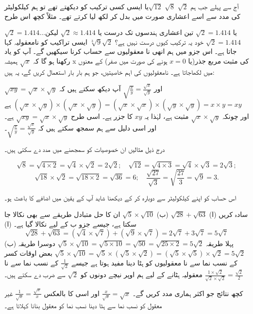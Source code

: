 آج سے پہلے جب ہم  \(\sqrt{2}\) \(\sqrt{8}\) \(\sqrt{12}\)یا ایسی کسی ترکیب کو دیکھتے تھے تو ہم کیلکولیٹر کی مدد سے اسے اعشاری صورت میں بدل کر لکھ لیا کرتے تھے۔ مثلاً کچھ اس طرح

\(\sqrt{2}=1.414\dotsc\)یا 
\(\sqrt{2}=1.414\) تین اعشاری ہندسوں تک درست یا
\(\sqrt{2}\approx 1.414\)
لیکن \(\sqrt{2}=1.414\) خود یہ ترکیب کیوں درست نہیں ہے؟
\(\sqrt{2}\)\(\sqrt[3]{9}\) ایسی تراکیب کو نامعقولیہ کہا جاتا ہے۔ اس جزو میں ہم انھی نا معقولیوں سے حساب کرنا سیکھیں گے۔
آپ کو یاد رکھنا ہو گا کہ \(\sqrt{x}\) ہمیشہ x کی مثبت مربع جذر(یا \(x=0\) ہونے کی صورت میں صفر) کے معنوں میں لکھاجاتا ہے۔
نامعقولیوں کی اہم خاصیتیں، جو ہم بار بار استعمال کریں گے، یہ ہیں:

\(\sqrt{xy}=\sqrt{x}\times\sqrt{y}\)
 اور 
\(\sqrt{\frac{x}{y}}=\frac{\sqrt{x}}{\sqrt{y}}\)
آپ دیکھ سکتے ہیں کہ \((\sqrt{x}\times\sqrt{y})\times(\sqrt{x}\times\sqrt{y})=(\sqrt{x}\times\sqrt{x})\times(\sqrt{y}\times\sqrt{y})=x\times y=xy\)  ہے اور چونکہ \(\sqrt{x}\times\sqrt{y}\) مثبت ہے، لہٰذا یہ \(xy\) کا جزر ہے۔ اسی طرح \(\sqrt{xy}=\sqrt{x}\times\sqrt{y}\) ہے۔ اور اسی دلیل سے ہم سمجھ سکتے ہیں کہ \(\sqrt{\frac{x}{y}}=\frac{\sqrt{x}}{\sqrt{y}}\)۔

درج ذیل مثالیں ان خصوصیات کو سمجھنے میں مدد دے سکتی ہیں۔

\[\sqrt{8}=\sqrt{4\times 2}=\sqrt{4}\times\sqrt{2}=2\sqrt{2};\quad\sqrt{12}=\sqrt{4\times 3}=\sqrt{4}\times\sqrt{3}=2\sqrt{3};\]
\[\sqrt{18}\times \sqrt{2}=\sqrt{18\times 2}=\sqrt{36}=6;\quad \frac{\sqrt{27}}{\sqrt{3}}=\sqrt{\frac{27}{3}}=\sqrt{9}=3.\]

اس حساب کو اپنے کیلکولیٹر سے دوبارہ کر کے دیکھنا شاید آپ کے یقین میں اضافے کا باعث ہو۔

سادہ کریں 
(ا)
\(\sqrt{28}+\sqrt{63}\)
(ب) 
\(\sqrt{5}\times \sqrt{10}\)
ان کا حل متبادل طریقے سے بھی نکالا جا سکتا ہے، جیسے جزو ب کے لیے نکالا گیا ہے۔
(ا) \[\sqrt{28}+\sqrt{63}=(\sqrt{4}\times\sqrt{7})+(\sqrt{9}\times\sqrt{7})=2\sqrt{7}+3\sqrt{7}=5\sqrt{7}\]
(ب) پہلا طریقہ \(\sqrt{5}\times\sqrt{10}=\sqrt{5\times10}=\sqrt{50}=\sqrt{25\times 2}=5\sqrt{2}\)
دوسرا طریقہ \(\sqrt{5}\times\sqrt{10}=\sqrt{5}\times(\sqrt{5}\times\sqrt{2})=(\sqrt{5}\times\sqrt{5})\times\sqrt{2}=5\sqrt{2}\)
بعض اوقات کسر کے نسب نما سے نا معقولیوں کو ہٹا دینا مفید ہوتا ہے جیسے \(\frac{1}{\sqrt{2}}\) کے نسب نما سے نا معقولیہ ہٹانے کے لیے ہم اوپر نیچے دونوں کو \(\sqrt{2}\) سے ضرب دے سکتے ہیں۔ \(\frac{1\times\sqrt{2}}{\sqrt{2}\times\sqrt{2}}=\frac{\sqrt{2}}{2}\)

کچھ نتائج جو اکثر ہماری مدد کریں گے۔
\(\frac{x}{\sqrt{x}}=\sqrt{x}\) اور اسی کا بالعکس \(\frac{1}{\sqrt{x}}=\frac{\sqrt{x}}{x}\)
غیر معقول کو نسب نما سے ہٹا دینا نسب نما کو معقول بنانا کہلاتا ہے۔

